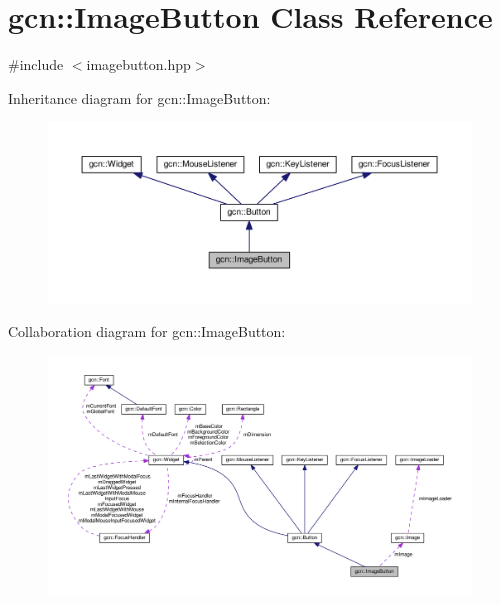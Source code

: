 \hypertarget{classgcn_1_1ImageButton}{}\section{gcn\+:\+:Image\+Button Class Reference}
\label{classgcn_1_1ImageButton}


{\ttfamily \#include $<$imagebutton.\+hpp$>$}



Inheritance diagram for gcn\+:\+:Image\+Button\+:\nopagebreak
\begin{figure}[H]
\begin{center}
\leavevmode
\includegraphics[width=350pt]{classgcn_1_1ImageButton__inherit__graph}
\end{center}
\end{figure}


Collaboration diagram for gcn\+:\+:Image\+Button\+:\nopagebreak
\begin{figure}[H]
\begin{center}
\leavevmode
\includegraphics[width=350pt]{classgcn_1_1ImageButton__coll__graph}
\end{center}
\end{figure}
